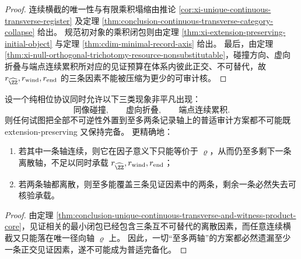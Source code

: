 \begin{proof}
连续横截的唯一性与有限乘积塌缩由推论 \ref{cor:xi-unique-continuous-transverse-register} 及定理 \ref{thm:conclusion-continuous-transverse-category-collapse} 给出。
规范初对象的乘积闭包则由定理 \ref{thm:xi-extension-preserving-initial-object} 与定理 \ref{thm:cdim-minimal-record-axis} 给出。
最后，由定理 \ref{thm:xi-null-orthogonal-trichotomy-resource-nonsubstitutable}，碰撞方向、虚向折叠与端点连续累积所对应的见证预算在体系内彼此正交、不可替代，故 \(r_{\widehat{\ZZ}},r_{\mathrm{wind}},r_{\mathrm{end}}\) 的三条因素不能被压缩为更少的可审计核。
\end{proof}

\begin{corollary}[不存在二轴审计的普适完备化]\label{cor:conclusion-no-universal-two-axis-audit-completion}
设一个纯相位协议同时允许以下三类现象非平凡出现：
\[
\text{同像碰撞},\qquad
\text{虚向折叠},\qquad
\text{端点连续累积}.
\]
则任何试图把全部不可逆性外置到至多两条记录轴上的普适审计方案都不可能既 extension-preserving 又保持完备。
更精确地：
\begin{enumerate}
  \item 若其中一条轴连续，则它在因子意义下只能等价于 \(\varrho\)，从而仍至多剩下一条离散轴，不足以同时承载 \(r_{\widehat{\ZZ}},r_{\mathrm{wind}},r_{\mathrm{end}}\)；
  \item 若两条轴都离散，则至多能覆盖三条见证因素中的两条，剩余一条必然失去可核验承载。
\end{enumerate}
\end{corollary}

\begin{proof}
由定理 \ref{thm:conclusion-unique-continuous-transverse-and-witness-product-core}，见证相关的最小闭包已经包含三条互不可替代的离散因素，而任意连续横截又只能落在唯一径向轴 \(\varrho\) 上。
因此，一切“至多两轴”的方案都必然遗漏至少一条正交见证因素，遂不可能成为普适完备化。
\end{proof}

